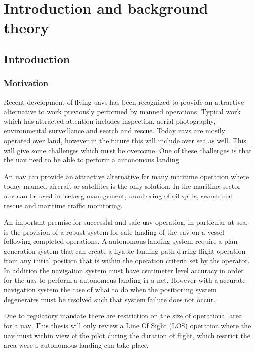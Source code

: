 \part{Introduction and background theory}
\chapter{Introduction}
\section{Motivation}
Recent development of flying \glspl{uav} has been recognized to provide an attractive alternative to work previously performed by manned operations. Typical work which has attracted attention includes inspection, aerial photography, environmental surveillance and search and rescue. Today \glspl{uav} are mostly operated over land, however in the future this will include over sea as well. This will give some challenges which must be overcome. One of these challenges is that the \gls{uav} need to be able to perform a autonomous landing.

An \gls{uav} can provide an attractive alternative for many maritime operation where today manned aircraft or satellites is the only solution. In the maritime sector \gls{uav} can be used in iceberg management, monitoring of oil spills, search and rescue and maritime traffic monitoring.

An important premise for successful and safe \gls{uav} operation, in particular at sea, is the provision of a robust system for safe landing of the \gls{uav} on a vessel following completed operations. A autonomous landing system require a plan generation system that can create a flyable landing path during flight operation from any initial position that is within the operation criteria set by the operator. In addition the navigation system must have centimeter level accuracy in order for the \gls{uav} to perform a autonomous landing in a net. However with a accurate navigation system the case of what to do when the positioning system degenerates must be resolved such that system failure does not occur.

Due to regulatory mandate there are restriction on the size of operational area for a \gls{uav}. This thesis will only review a Line Of Sight (LOS) operation where the \gls{uav} must within view of the pilot during the duration of flight, which restrict the area were a autonomous landing can take place.

